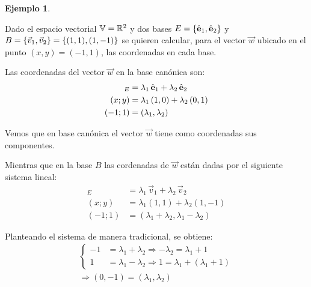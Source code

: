 \documentclass[a5paper,12pt,twoside]{book}
\newtheorem{example}{{Ejemplo}}[chapter]
\begin{document}
\begin{mdframed}[style=MyFrame2]
    \begin{example}
    \end{example}
    Dado el espacio vectorial $\mathbb{V}=\mathbb{R}^2$ y dos bases $E={ \left\{ {\hat{\textbf{e}}_1,\hat{\textbf{e}}_2} \right\} }$ y $B={ \left\{ {\Vec{v}_1,\Vec{v}_2} \right\} }={ \left\{ {(1,1),(1,-1)} \right\} }$ se quieren calcular, para el vector $\Vec{w}$ ubicado en el punto $(x,y)=(-1,1)$, las coordenadas en cada base.
    
    \begin{center}
    \end{center}
    
    Las coordenadas del vector $\Vec{w}$ en la base canónica son:
    \begin{align*}
        [\Vec{w}]_E &= \lambda_1 \, \eVer_1 + \lambda_2 \, \eVer_2
        \\
        (x;y) &= \lambda_1 \left(1,0\right) + \lambda_2 \left(0,1\right)
        \\
        (-1;1) &= (\lambda_1,\lambda_2)
    \end{align*}
    
    Vemos que en base canónica el vector $\Vec{w}$ tiene como coordenadas sus componentes.
    
    Mientras que en la base $B$ las cordenadas de $\Vec{w}$ están dadas por el siguiente sistema lineal:
    \begin{align*}
        [\Vec{w}]_E &= \lambda_1 \, \Vec{v}_1 + \lambda_2 \, \Vec{v}_2
        \\
        (x;y) &= \lambda_1 \left(1,1\right) + \lambda_2 \left(1,-1\right)
        \\
        (-1;1) &= (\lambda_1+\lambda_2,\lambda_1-\lambda_2)
    \end{align*}
    
    Planteando el sistema de manera tradicional, se obtiene:
    \begin{gather*}
        \left\{
        \begin{aligned}
            -1 &= \lambda_1+\lambda_2 \Rightarrow -\lambda_2=\lambda_1+1 
            \\
            1 &= \lambda_1-\lambda_2 \Rightarrow 1=\lambda_1+(\lambda_1+1)
        \end{aligned}
        \right.
        \\
        \Rightarrow (0,-1) = (\lambda_1,\lambda_2)
    \end{gather*}
    

\end{mdframed}
\end{document}
